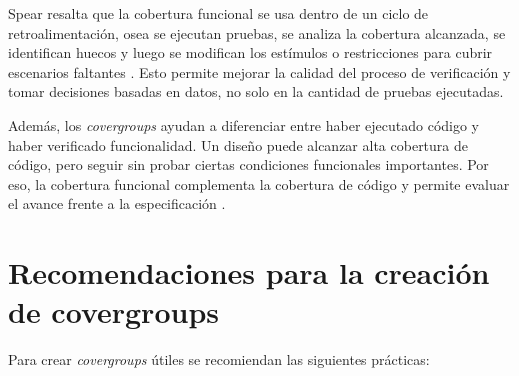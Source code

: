 ﻿\documentclass[conference]{IEEEtran}
\begin{document}
Spear resalta que la cobertura funcional se usa dentro de un ciclo de
retroalimentación, osea se ejecutan pruebas, se analiza la cobertura alcanzada, se
identifican huecos y luego se modifican los estímulos o restricciones para
cubrir escenarios faltantes \cite{Spear2008}. Esto permite mejorar la calidad
del proceso de verificación y tomar decisiones basadas en datos, no solo en la
cantidad de pruebas ejecutadas.

Además, los \textit{covergroups} ayudan a diferenciar entre haber ejecutado
código y haber verificado funcionalidad. Un diseño puede alcanzar alta
cobertura de código, pero seguir sin probar ciertas condiciones funcionales
importantes. Por eso, la cobertura funcional complementa la cobertura de
código y permite evaluar el avance frente a la especificación \cite{Spear2008}.

\section{Recomendaciones para la creación de covergroups}

Para crear \textit{covergroups} útiles se recomiendan las siguientes prácticas:
\end{document}
